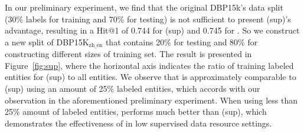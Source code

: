 In our preliminary experiment, we find that the original DBP15k's data split (30\% labels for training and 70\% for testing) is not sufficient to present \solution(sup)'s advantage, resulting in a Hit@1 of 0.744 for \solution(sup) and 0.745 for \solution.
So we construct a new split of DBP15K$_{\text{zh\_en}}$ that contains 20\% for testing and 80\% for constructing different sizes of training set. The result is presented in Figure~\ref{fig:sup}, where the horizontal axis indicates the ratio of training labeled entities for \solution(sup) to all entities. We observe that \solution is approximately comparable to \solution(sup) using an amount of 25\% labeled entities, which accords with our observation in the aforementioned preliminary experiment. When using less than 25\% amount of labeled entities, \solution performs much better than \solution(sup), which demonstrates the effectiveness of \solution in low supervised data resource settings.






